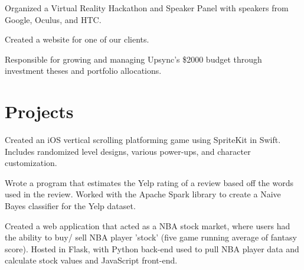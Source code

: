 \documentclass[]{deedy-resume-openfont}
\begin{document}
\begin{minipage}[t]{0.66\textwidth}
\begin{comment}
\runsubsection{Cambi}
\descript{| Software Engineering Intern}
\location{September 2018 - December 2018 | Berkeley, CA}
\begin{tightemize}
\item Worked on adding features and streamlining their application by making the UI more intuitive in XCode.
\item Changed the viewing screens to allow users to see more relevant information regarding cards at once.
\end{tightemize}
\sectionsep
\end{comment}

\begin{tightemize}
\item Organized a Virtual Reality Hackathon and Speaker Panel with speakers from Google, Oculus, and HTC.
\item Created a website for one of our clients.
\item Responsible for growing and managing Upsync's \$2000 budget through investment theses and portfolio allocations.
\end{tightemize}
\sectionsep


\section{Projects}

Created an iOS vertical scrolling platforming game using SpriteKit in Swift. Includes randomized level designs, various power-ups, and character customization.

\sectionsep

Wrote a program that estimates the Yelp rating of a review based off the words used in the review. Worked with the Apache Spark library to create a Naive Bayes classifier for the Yelp dataset. 
\sectionsep

Created a web application that acted as a NBA stock market, where users had the ability to buy/ sell NBA player 'stock' (five game running average of fantasy score). Hosted in Flask, with Python back-end used to pull NBA player data and calculate stock values and JavaScript front-end. 
\sectionsep


\end{minipage}
\end{document}
